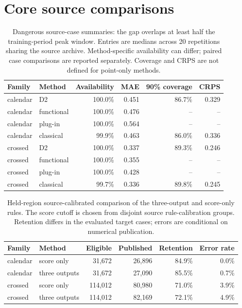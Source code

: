 \section{Core source comparisons}
\begin{table}[p]\centering\footnotesize
\caption{Dangerous source-case summaries: the gap overlaps at least half the training-period peak window. Entries are medians across 20 repetitions sharing the source archive. Method-specific availability can differ; paired case comparisons are reported separately. Coverage and CRPS are not defined for point-only methods.}\label{tab:focused-annual}
\begin{tabular}{llrrrr}\toprule
Family & Method & Availability & MAE & 90\% coverage & CRPS\\\midrule
calendar & D2 & 100.0\% & 0.451 & 86.7\% & 0.329\\
calendar & functional & 100.0\% & 0.476 & -- & --\\
calendar & plug-in & 100.0\% & 0.564 & -- & --\\
calendar & classical & 99.9\% & 0.463 & 86.0\% & 0.336\\
crossed & D2 & 100.0\% & 0.337 & 89.3\% & 0.246\\
crossed & functional & 100.0\% & 0.355 & -- & --\\
crossed & plug-in & 100.0\% & 0.428 & -- & --\\
crossed & classical & 99.7\% & 0.336 & 89.8\% & 0.245\\
\bottomrule\end{tabular}
\end{table}
\begin{table}[p]\centering\footnotesize
\caption{Held-region source-calibrated comparison of the three-output and score-only rules. The score cutoff is chosen from disjoint source rule-calibration groups. Retention differs in the evaluated target cases; errors are conditional on numerical publication.}\label{tab:focused-source-release}
\begin{tabular}{llrrrr}\toprule
Family & Method & Eligible & Published & Retention & Error rate\\\midrule
calendar & score only & 31,672 & 26,896 & 84.9\% & 0.0\%\\
calendar & three outputs & 31,672 & 27,090 & 85.5\% & 0.7\%\\
crossed & score only & 114,012 & 80,980 & 71.0\% & 3.9\%\\
crossed & three outputs & 114,012 & 82,169 & 72.1\% & 4.9\%\\
\bottomrule\end{tabular}
\end{table}
